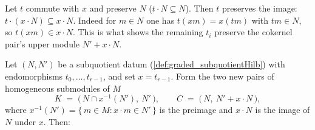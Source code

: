 \begin{lemma}\leanok
  \label{lem:graded_map_map_le_of_commute}
  Let \(t\) commute with \(x\) and preserve \(N\) (\(t \cdot N \subseteq N\)). Then
  \(t\) preserves the image: \(t \cdot (x \cdot N) \subseteq x \cdot N\). Indeed for
  \(m \in N\) one has \(t(x m) = x(t m)\) with \(t m \in N\), so \(t(x m) \in x \cdot
  N\). This is what shows the remaining \(t_i\) preserve the cokernel pair's upper
  module \(N' + x \cdot N\).
\end{lemma}

\begin{lemma}\leanok
  \label{lem:graded_subquotient_ker_coker}
  Let \((N, N')\) be a subquotient datum (\cref{def:graded_subquotientHilb}) with
  endomorphisms \(t_0, \dots, t_{r-1}\), and set \(x = t_{r-1}\). Form the two new
  pairs of homogeneous submodules of \(M\)
  \[
    K \;=\; \bigl(\,N \cap x^{-1}(N'),\ N'\,\bigr),
    \qquad
    C \;=\; \bigl(\,N,\ N' + x \cdot N\,\bigr),
  \]
  where \(x^{-1}(N') = \{\,m \in M : x \cdot m \in N'\,\}\) is the preimage and
  \(x \cdot N\) is the image of \(N\) under \(x\). Then:
  \begin{enumerate}

\end{enumerate}
\end{lemma}
